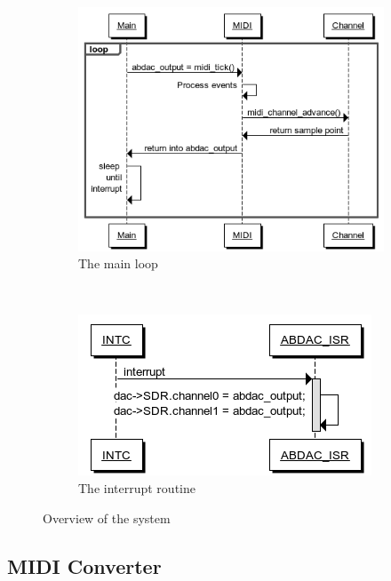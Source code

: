 \documentclass[a4paper,12pt]{article}
\begin{document}
\begin{figure}
        \centering
        \begin{subfigure}[b]{0.57\textwidth}
                \centering
                \includegraphics[width=\textwidth]{progflow}
                \caption{The main loop}
                \label{mainloop}
        \end{subfigure}%
        ~ 
        \begin{subfigure}[b]{0.52\textwidth}
                \centering
                \includegraphics[width=\textwidth]{interrupt}
                \caption{The interrupt routine}
                \label{interrupt}
        \end{subfigure}
      \caption{Overview of the system}
   \label{progflow}
\end{figure}
\subsection{MIDI Converter}
\end{document}
